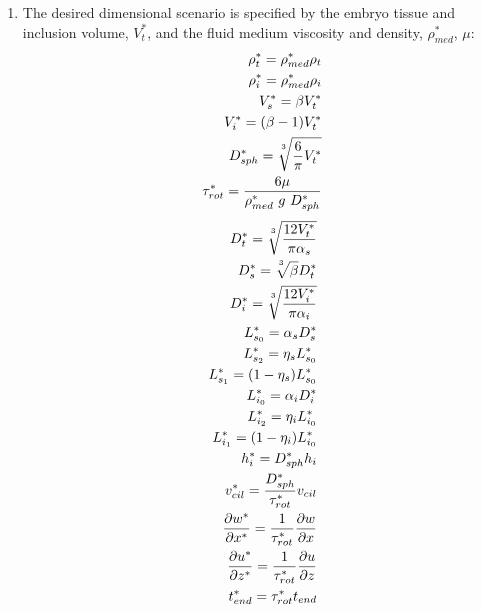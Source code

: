 \documentclass[10pt,a4paper]{article}
\def\non{\nonumber}
\def\p{\partial}
\begin{document}
\begin{enumerate}
	\item The desired dimensional scenario is specified by the embryo tissue and inclusion volume, $V_t^*$, and the fluid medium viscosity and density, $\rho^*_{med}$, $\mu$:
\begin{eqnarray}\label{nd2dpars3}
	\rho^*_t = \rho^*_{med} \rho_t \non \\
	\rho^*_i = \rho^*_{med} \rho_i \non \\
	V_s^* = \beta V_t^* \non \\
	V_i^* = (\beta-1) V_t^* \non \\
	D_{sph}^* = \sqrt[\uproot{5}3]{\frac{6}{\pi} V_t^*} \non \\
	\tau^*_{rot} = \frac{6 \mu}{\rho^*_{med} ~ g ~ D_{sph}^*}
\end{eqnarray}
\begin{eqnarray}\label{nd2dpars4}
	D_t^* = \sqrt[\uproot{5}3]{\frac{12 V_t^*}{\pi \alpha_s}} \non \\
	D_s^* = \sqrt[\uproot{5}3]{\beta} D_t^* \non \\
	D^*_i = \sqrt[\uproot{5}3]{\frac{12 V_i^*}{\pi \alpha_i}} \non \\
	L^*_{s_0} = \alpha_s D^*_s \non \\
	L^*_{s_2} = \eta_s L^*_{s_0} \non \\
	L^*_{s_1} = (1-\eta_s) L^*_{s_0} \non \\
	L^*_{i_0} = \alpha_i D^*_i \non \\
	L^*_{i_2} = \eta_i L^*_{i_0} \non \\
	L^*_{i_1} = (1-\eta_i) L^*_{i_0} \non \\
	h^*_i = D_{sph}^* h_i \non \\
	v^*_{cil} = \frac{D_{sph}^*}{{\tau^*_{rot}}}  v_{cil} \non \\
	\frac{\p w^*}{\p x^*} = \frac{1}{\tau^*_{rot}} \frac{\p w}{\p x} \non \\
	\frac{\p u^*}{\p z^*} = \frac{1}{\tau^*_{rot}} \frac{\p u}{\p z} \non \\
	t^*_{end} = \tau^*_{rot} t_{end}
\end{eqnarray}
	
\end{enumerate}
\end{document}
